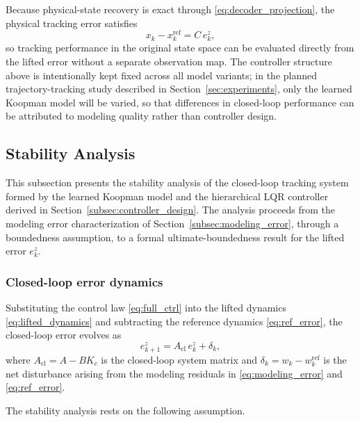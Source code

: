 \documentclass[journal]{IEEEtran}
\begin{document}
Because physical-state recovery is exact through \eqref{eq:decoder_projection}, the physical tracking error satisfies
\begin{equation}
    x_k - x_k^{\mathrm{ref}} = C\,e_k^z,
\end{equation}
so tracking performance in the original state space can be evaluated directly from the lifted error without a separate observation map. The controller structure above is intentionally kept fixed across all model variants; in the planned trajectory-tracking study described in Section~\ref{sec:experiments}, only the learned Koopman model will be varied, so that differences in closed-loop performance can be attributed to modeling quality rather than controller design.

\subsection{Stability Analysis}
\label{subsec:stability}

This subsection presents the stability analysis of the closed-loop tracking system formed by the learned Koopman model and the hierarchical LQR controller derived in Section~\ref{subsec:controller_design}. The analysis proceeds from the modeling error characterization of Section~\ref{subsec:modeling_error}, through a boundedness assumption, to a formal ultimate-boundedness result for the lifted error $e_k^z$.

\subsubsection*{Closed-loop error dynamics}

Substituting the control law \eqref{eq:full_ctrl} into the lifted dynamics \eqref{eq:lifted_dynamics} and subtracting the reference dynamics \eqref{eq:ref_error}, the closed-loop error evolves as
\begin{equation}
    e_{k+1}^z = A_{\mathrm{cl}}\, e_k^z + \delta_k,
    \label{eq:cl_error_dyn}
\end{equation}
where $A_{\mathrm{cl}} = A - BK_c$ is the closed-loop system matrix and $\delta_k = w_k - w_k^{\mathrm{ref}}$ is the net disturbance arising from the modeling residuals in \eqref{eq:modeling_error} and \eqref{eq:ref_error}.

The stability analysis rests on the following assumption.
\end{document}
